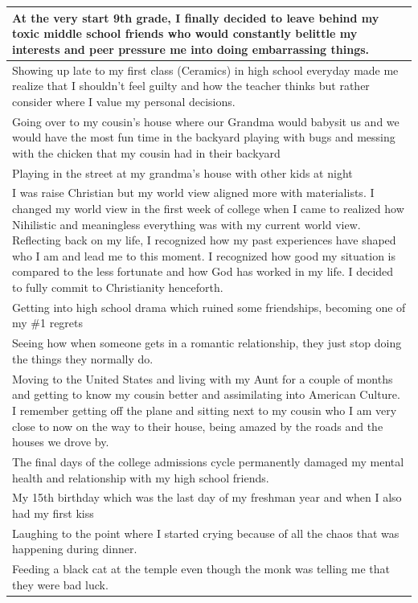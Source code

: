 \documentclass[
  .7em,
  letterpaper,
  DIV=11,
  numbers=noendperiod]{scrartcl}
\begin{document}
\begin{table}
\begin{tabular}{l}
\hline
At the very start 9th grade, I finally decided to leave behind my toxic middle school friends who would constantly belittle my interests and peer pressure me into doing embarrassing things.\\
\hline
Showing up late to my first class (Ceramics) in high school everyday made me realize that I shouldn't feel guilty and how the teacher thinks but rather consider where I value my personal decisions.\\
\hline
Going over to my cousin's house where our Grandma would babysit us and we would have the most fun time in the backyard playing with bugs and messing with the chicken that my cousin had in their backyard\\
\hline
Playing in the street at my grandma's house with other kids at night\\
\hline
I was raise Christian but my world view aligned more with materialists. I changed my world view in the first week of college when I came to realized how Nihilistic and meaningless everything was with my current world view. Reflecting back on my life, I recognized how my past experiences have shaped who I am and lead me to this moment. I recognized how good my situation is compared to the less fortunate and how God has worked in my life. I decided to fully commit to Christianity henceforth.\\
\hline
Getting into high school drama which ruined some friendships, becoming one of my \#1 regrets\\
\hline
Seeing how when someone gets in a romantic relationship, they just stop doing the things they normally do.\\
\hline
Moving to the United States and living with my Aunt for a couple of months and getting to know my cousin better and assimilating into American Culture. I remember getting off the plane and sitting next to my cousin who I am very close to now on the way to their house, being amazed by the roads and the houses we drove by.\\
\hline
The final days of the college admissions cycle permanently damaged my mental health and relationship with my high school friends.\\
\hline
My 15th birthday which was the last day of my freshman year and when I also had my first kiss\\
\hline
Laughing to the point where I started crying because of all the chaos that was happening during dinner.\\
\hline
Feeding a black cat at the temple even though the monk was telling me that they were bad luck.\\

\end{tabular}
\end{table}
\end{document}
